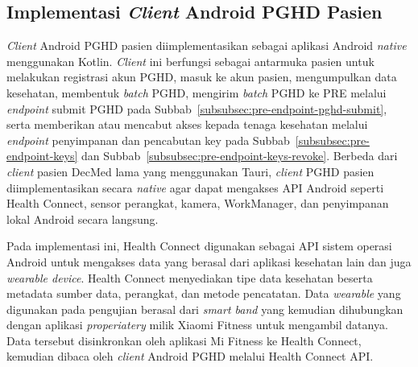 \subsection{Implementasi \textit{Client} Android PGHD Pasien}

\textit{Client} Android PGHD pasien diimplementasikan sebagai aplikasi Android \textit{native} menggunakan Kotlin. 
\textit{Client} ini berfungsi sebagai antarmuka pasien untuk melakukan registrasi akun PGHD, masuk ke akun pasien, mengumpulkan data kesehatan, membentuk \textit{batch} PGHD, mengirim \textit{batch} PGHD ke PRE melalui \textit{endpoint} submit PGHD pada Subbab~\ref{subsubsec:pre-endpoint-pghd-submit}, serta memberikan atau mencabut akses kepada tenaga kesehatan melalui \textit{endpoint} penyimpanan dan pencabutan key pada Subbab~\ref{subsubsec:pre-endpoint-keys} dan Subbab~\ref{subsubsec:pre-endpoint-keys-revoke}. 
Berbeda dari \textit{client} pasien DecMed lama yang menggunakan Tauri, \textit{client} PGHD pasien diimplementasikan secara \textit{native} agar dapat mengakses API Android seperti Health Connect, sensor perangkat, kamera, WorkManager, dan penyimpanan lokal Android secara langsung.




Pada implementasi ini, Health Connect digunakan sebagai API sistem operasi Android untuk mengakses data yang berasal dari aplikasi kesehatan lain dan juga \textit{wearable device}. 
Health Connect menyediakan tipe data kesehatan beserta metadata sumber data, perangkat, dan metode pencatatan. 
Data \textit{wearable} yang digunakan pada pengujian berasal dari \textit{smart band} yang kemudian dihubungkan dengan aplikasi \textit{properiatery} milik Xiaomi Fitness untuk mengambil datanya. 
Data tersebut disinkronkan oleh aplikasi Mi Fitness ke Health Connect, kemudian dibaca oleh \textit{client} Android PGHD melalui Health Connect API\@.

